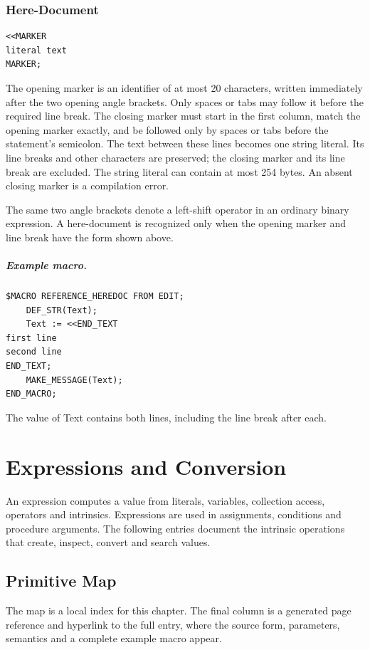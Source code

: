 \documentclass[a4paper,10pt,twoside,openany]{book}
\newenvironment{mrmacextension}{\begin{changebar}}{\end{changebar}}
\begin{document}
\begin{mrmacextension}
\label{prim:form-here-document}
\subsection*{Here-Document}
\begin{verbatim}
<<MARKER
literal text
MARKER;
\end{verbatim}
The opening marker is an identifier of at most 20 characters, written
immediately after the two opening angle brackets. Only spaces or tabs may
follow it before the required line break. The closing marker must start in the
first column, match the opening marker exactly, and be followed only by spaces
or tabs before the statement's semicolon. The text between these lines becomes
one string literal. Its line breaks and other characters are preserved; the
closing marker and its line break are excluded. The string literal can contain
at most 254 bytes. An absent closing marker is a compilation error.

The same two angle brackets denote a left-shift operator in an ordinary binary
expression. A here-document is recognized only when the opening marker and
line break have the form shown above.

\paragraph{Example macro.}
\begin{verbatim}
$MACRO REFERENCE_HEREDOC FROM EDIT;
    DEF_STR(Text);
    Text := <<END_TEXT
first line
second line
END_TEXT;
    MAKE_MESSAGE(Text);
END_MACRO;
\end{verbatim}
The value of Text contains both lines, including the line break after each.
\end{mrmacextension}

\chapter{Expressions and Conversion}

An expression computes a value from literals, variables, collection access, operators and intrinsics. Expressions are used in assignments, conditions and procedure arguments. The following entries document the intrinsic operations that create, inspect, convert and search values.

\section{Primitive Map}
The map is a local index for this chapter. The final column is a generated page
reference and hyperlink to the full entry, where the source form, parameters,
semantics and a complete example macro appear.
\end{document}
